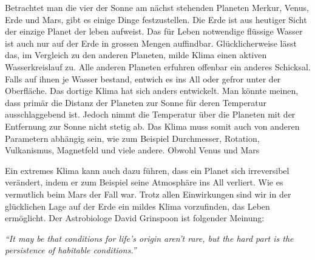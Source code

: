 \begin{refsection}

Betrachtet man die vier der Sonne am nächst stehenden Planeten Merkur, Venus, Erde und Mars, gibt es einige Dinge festzustellen.
Die Erde ist aus heutiger Sicht der einzige Planet der leben aufweist. Das für Leben notwendige flüssige Wasser ist auch nur auf der Erde in grossen Mengen auffindbar. Glücklicherweise lässt das, im Vergleich zu den anderen Planeten, milde Klima einen aktiven Wasserkreislauf zu. Alle anderen Planeten erfuhren offenbar ein anderes Schicksal. Falls auf ihnen je Wasser bestand, entwich es ins All oder gefror unter der Oberfläche. Das dortige Klima hat sich anders entwickelt.
Man könnte meinen, dass primär die Distanz der Planeten zur Sonne für deren Temperatur ausschlaggebend ist. Jedoch nimmt die Temperatur über die Planeten mit der Entfernung zur Sonne nicht stetig ab. Das Klima muss somit auch von anderen Parametern abhängig sein, wie zum Beispiel Durchmesser, Rotation, Vulkanismus, Magnetfeld und viele andere. Obwohl Venus und Mars 


Ein extremes Klima kann auch dazu führen, dass ein Planet sich irreversibel verändert, indem er zum Beispiel seine Atmosphäre ins All verliert. Wie es vermutlich beim Mars der Fall war. Trotz allen Einwirkungen sind wir in der glücklichen Lage auf der Erde ein mildes Klima vorzufinden, das Leben ermöglicht. Der Astrobiologe David Grinspoon ist folgender Meinung:

\vspace{5pt}
\textit{“It may be that conditions for life’s origin aren’t rare, but the hard part is the persistence of habitable conditions.”} \\
\cite{AstrobiologyMagazine} %
\vspace{5pt}


\end{refsection}
